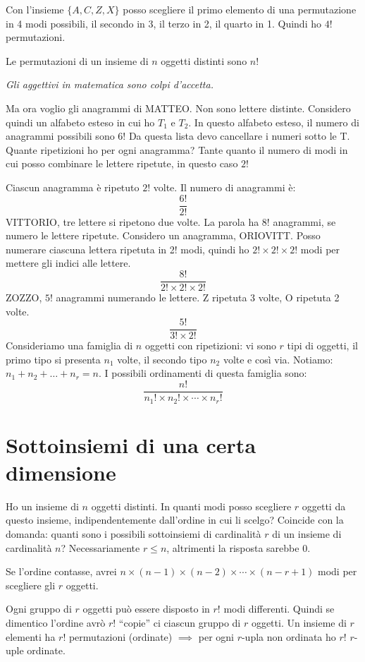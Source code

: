 Con l'insieme $\{A,C,Z,X\}$ posso scegliere il primo elemento di una permutazione in 4 modi possibili, il secondo in 3, il terzo in 2, il quarto in 1. Quindi ho $4!$ permutazioni.

Le permutazioni di un insieme di $n$ oggetti distinti sono $n!$

\textit{Gli aggettivi in matematica sono colpi d'accetta.}

Ma ora voglio gli anagrammi di MATTEO. Non sono lettere distinte. Considero quindi un alfabeto esteso in cui ho $T_1$ e $T_2$. In questo alfabeto esteso, il numero di anagrammi possibili sono 6! Da questa lista devo cancellare i numeri sotto le T. Quante ripetizioni ho per ogni anagramma? Tante quanto il numero di modi in cui posso combinare le lettere ripetute, in questo caso $2!$

Ciascun anagramma \`e ripetuto $2!$ volte. Il numero di anagrammi \`e:
\[
\frac{6!}{2!}
\]
VITTORIO, tre lettere si ripetono due volte. La parola ha 8! anagrammi, se numero le lettere ripetute. Considero un anagramma, ORIOVITT. Posso numerare ciascuna lettera ripetuta in 2! modi, quindi ho $2! \times 2! \times 2!$ modi per mettere gli indici alle lettere.
\[
\frac{8!}{2! \times 2! \times 2!}
\]
ZOZZO, $5!$ anagrammi numerando le lettere. Z ripetuta 3 volte, O ripetuta 2 volte.
\[
\frac{5!}{3! \times 2!}
\]
Consideriamo una famiglia di $n$ oggetti con ripetizioni: vi sono $r$ tipi di oggetti, il primo tipo si presenta $n_1$ volte, il secondo tipo $n_2$ volte e cos\`i via. Notiamo: $ n_1 + n_2 + \dots + n_r = n$. I possibili ordinamenti di questa famiglia sono:
\[
\frac{ n! }{ n_1! \times n_2! \times \cdots \times n_r!}
\]

\section{Sottoinsiemi di una certa dimensione}

Ho un insieme di $n$ oggetti distinti. In quanti modi posso scegliere $r$ oggetti da questo insieme, indipendentemente dall'ordine in cui li scelgo? Coincide con la domanda: quanti sono i possibili sottoinsiemi di cardinalit\`a $r$ di un insieme di cardinalit\`a $n$? Necessariamente $r \leq n$, altrimenti la risposta sarebbe 0.

Se l'ordine contasse, avrei $n \times (n-1) \times (n-2) \times \cdots \times (n-r+1)$ modi per scegliere gli $r$ oggetti.

Ogni gruppo di $r$ oggetti pu\`o essere disposto in $r!$ modi differenti. Quindi se dimentico l'ordine avr\`o $r!$ ``copie'' ci ciascun gruppo di $r$ oggetti. Un insieme di $r$ elementi ha $r!$ permutazioni (ordinate) $\implies$ per ogni $r$-upla non ordinata ho $r!$ $r$-uple ordinate.

